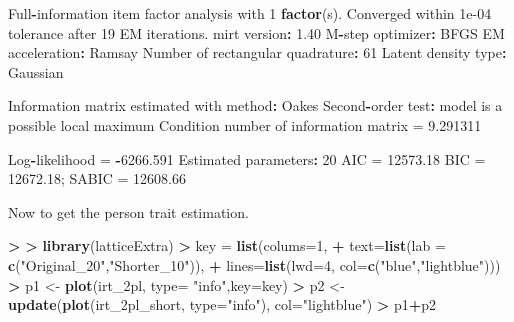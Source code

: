\documentclass[
]{article}
\newenvironment{Shaded}{\begin{snugshade}}{\end{snugshade}}
\newcommand{\AttributeTok}[1]{\textcolor[rgb]{0.13,0.29,0.53}{#1}}
\newcommand{\DecValTok}[1]{\textcolor[rgb]{0.00,0.00,0.81}{#1}}
\newcommand{\ErrorTok}[1]{\textcolor[rgb]{0.64,0.00,0.00}{\textbf{#1}}}
\newcommand{\FloatTok}[1]{\textcolor[rgb]{0.00,0.00,0.81}{#1}}
\newcommand{\FunctionTok}[1]{\textcolor[rgb]{0.13,0.29,0.53}{\textbf{#1}}}
\newcommand{\NormalTok}[1]{#1}
\newcommand{\OtherTok}[1]{\textcolor[rgb]{0.56,0.35,0.01}{#1}}
\newcommand{\SpecialCharTok}[1]{\textcolor[rgb]{0.81,0.36,0.00}{\textbf{#1}}}
\newcommand{\StringTok}[1]{\textcolor[rgb]{0.31,0.60,0.02}{#1}}
\begin{document}
\begin{Shaded}
\begin{Highlighting}[]
\NormalTok{Full}\SpecialCharTok{{-}}\NormalTok{information item factor analysis with }\DecValTok{1} \FunctionTok{factor}\NormalTok{(s).}
\NormalTok{Converged within }\FloatTok{1e{-}04}\NormalTok{ tolerance after }\DecValTok{19}\NormalTok{ EM iterations.}
\NormalTok{mirt version}\SpecialCharTok{:} \FloatTok{1.40} 
\NormalTok{M}\SpecialCharTok{{-}}\NormalTok{step optimizer}\SpecialCharTok{:}\NormalTok{ BFGS }
\NormalTok{EM acceleration}\SpecialCharTok{:}\NormalTok{ Ramsay }
\NormalTok{Number of rectangular quadrature}\SpecialCharTok{:} \DecValTok{61}
\NormalTok{Latent density type}\SpecialCharTok{:}\NormalTok{ Gaussian }

\NormalTok{Information matrix estimated with method}\SpecialCharTok{:}\NormalTok{ Oakes}
\NormalTok{Second}\SpecialCharTok{{-}}\NormalTok{order test}\SpecialCharTok{:}\NormalTok{ model is a possible local maximum}
\NormalTok{Condition number of information matrix }\OtherTok{=}  \FloatTok{9.291311}

\NormalTok{Log}\SpecialCharTok{{-}}\NormalTok{likelihood }\OtherTok{=} \SpecialCharTok{{-}}\FloatTok{6266.591}
\NormalTok{Estimated parameters}\SpecialCharTok{:} \DecValTok{20} 
\NormalTok{AIC }\OtherTok{=} \FloatTok{12573.18}
\NormalTok{BIC }\OtherTok{=} \FloatTok{12672.18}\NormalTok{; SABIC }\OtherTok{=} \FloatTok{12608.66}
\end{Highlighting}
\end{Shaded}

Now to get the person trait estimation.

\begin{Shaded}
\begin{Highlighting}[]
\SpecialCharTok{\textgreater{}} 
\ErrorTok{\textgreater{}} \FunctionTok{library}\NormalTok{(latticeExtra)}
\SpecialCharTok{\textgreater{}}\NormalTok{ key }\OtherTok{=} \FunctionTok{list}\NormalTok{(}\AttributeTok{colums=}\DecValTok{1}\NormalTok{,}
\SpecialCharTok{+}            \AttributeTok{text=}\FunctionTok{list}\NormalTok{(}\AttributeTok{lab =} \FunctionTok{c}\NormalTok{(}\StringTok{"Original\_20"}\NormalTok{,}\StringTok{"Shorter\_10"}\NormalTok{)),}
\SpecialCharTok{+}            \AttributeTok{lines=}\FunctionTok{list}\NormalTok{(}\AttributeTok{lwd=}\DecValTok{4}\NormalTok{, }\AttributeTok{col=}\FunctionTok{c}\NormalTok{(}\StringTok{"blue"}\NormalTok{,}\StringTok{"lightblue"}\NormalTok{)))}
\SpecialCharTok{\textgreater{}}\NormalTok{ p1 }\OtherTok{\textless{}{-}} \FunctionTok{plot}\NormalTok{(irt\_2pl, }\AttributeTok{type=} \StringTok{"info"}\NormalTok{,}\AttributeTok{key=}\NormalTok{key)}
\SpecialCharTok{\textgreater{}}\NormalTok{ p2 }\OtherTok{\textless{}{-}} \FunctionTok{update}\NormalTok{(}\FunctionTok{plot}\NormalTok{(irt\_2pl\_short, }\AttributeTok{type=}\StringTok{"info"}\NormalTok{), }\AttributeTok{col=}\StringTok{"lightblue"}\NormalTok{)}
\SpecialCharTok{\textgreater{}}\NormalTok{ p1}\SpecialCharTok{+}\NormalTok{p2}
\end{Highlighting}
\end{Shaded}
\end{document}
